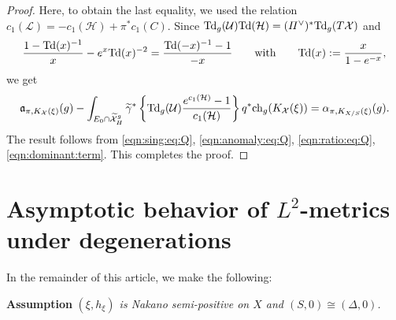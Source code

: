 \documentclass[amscd, leqno]{amsart}
\theoremstyle{plain}
\theoremstyle{definition}
\theoremstyle{remark}
\newenvironment{pf}{\begin{proof}}{\end{proof}}
\begin{document}
\begin{pf}
Here, to obtain the last equality, we used the relation $c_{1}({\mathcal L}) = -c_{1}({\mathcal H}) + \pi^{*}c_{1}(C)$.
Since ${\rm Td}_{g}({\mathcal U}){\rm Td}({\mathcal H})=(\varPi^{\lor})^{*}{\rm Td}_{g}(T{\mathcal X})$ and
$$
\frac{1-{\rm Td}(x)^{-1}}{x}-e^{x}{\rm Td}(x)^{-2}=\frac{{\rm Td}(-x)^{-1}-1}{-x}
\qquad\text{with}\qquad
{\rm Td}(x) := \frac{x}{1-e^{-x}},
$$
we get
\begin{equation}
\label{eqn:dominant:term}
{\mathfrak a}_{\pi, K_{\mathcal X}(\xi)}(g) 
- 
\int_{E_{0}\cap\widetilde{\mathcal X}_{H}^{g}} \widetilde{\gamma}^{*}
\left\{ {\rm Td}_{g}({\mathcal U})\frac{e^{c_{1}({\mathcal H})}-1}{c_{1}({\mathcal H})} \right\} q^{*}{\rm ch}_{g}(K_{\mathcal X}(\xi))
=
\alpha_{\pi, K_{X/S}(\xi)}(g).
\end{equation}
The result follows from \eqref{eqn:sing:eq:Q}, \eqref{eqn:anomaly:eq:Q}, \eqref{eqn:ratio:eq:Q}, \eqref{eqn:dominant:term}. 
This completes the proof.
\end{pf}






\section
{Asymptotic behavior of $L^{2}$-metrics under degenerations}
\label{sect:4}
\par
In the remainder of this article, we make the following:

\medskip
\par\noindent
{\bf Assumption}\quad
{\em $(\xi,h_{\xi})$ is Nakano semi-positive on $X$ and $(S,0)\cong(\varDelta,0)$.}
\end{document}
